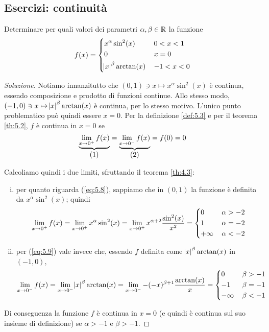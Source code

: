 \subsection{Esercizi: continuità}
\begin{exercise}
    \label{ex:5.3}
    Determinare per quali valori dei parametri $\alpha, \beta\in\amsbb{R}$ la funzione
    \[
    f(x) = \begin{dcases}
        x^\alpha\sin^2(x)\, & 0<x<1\\
        0\, & x=0\\
        \abs{x}^\beta \arctan(x)\, & -1<x<0
    \end{dcases}
    \]
\end{exercise}
\begin{proof}[Soluzione]
    Notiamo innanzitutto che $(0,1)\ni x \mapsto x^\alpha \sin^2(x)$ è continua, essendo composizione e prodotto di funzioni continue. Allo stesso modo, $(-1, 0)\ni x \mapsto \abs{x}^\beta \arctan(x)$ è continua, per lo stesso motivo. L'unico punto problematico può quindi essere $x=0$. Per la definizione \ref{def:5.3} e per il teorema \ref{th:5.2}, $f$ è continua in $x=0$ se
    \[
    \underbrace{\lim_{x\to 0^+} f(x)}_{\stepcounter{equation}\mbox{(\theequation)}} = \underbrace{\lim_{x\to 0^-} f(x)}_{\stepcounter{equation}\mbox{(\theequation)}} = f(0) = 0
    \]
    \addtocounter{equation}{-2}\label{eq:5.8}
    \addtocounter{equation}{0}\label{eq:5.9}
    Calcoliamo quindi i due limiti, sfruttando il teorema \ref{th:4.3}:
    \begin{enumerate}[(i)]
        \item per quanto riguarda (\ref{eq:5.8}), sappiamo che in $(0,1)$ la funzione è definita da $x^\alpha\sin^2(x)$; quindi
        \[
        \lim_{x\to 0^+}f(x) = \lim_{x\to 0^+} x^\alpha \sin^2(x) = \lim_{x\to 0^+} x^{\alpha +2} \frac{\sin^2(x)}{x^2} = \begin{dcases}
            0\, & \alpha>-2\\
            1\, & \alpha = -2\\
            +\infty\, & \alpha<-2
        \end{dcases}
        \]
        \item per (\ref{eq:5.9}) vale invece che, essendo $f$ definita come $\abs{x}^\beta \arctan(x)$ in $(-1,0)$,
        \[
        \lim_{x\to 0^-} f(x) = \lim_{x\to 0^-} \abs{x}^\beta \arctan(x) = \lim_{x\to 0^-} -(-x)^{\beta+1} \frac{\arctan(x)}{x}= \begin{dcases}
            0\, & \beta>-1\\
            -1\, & \beta=-1\\
            -\infty\, & \beta<-1
        \end{dcases}
        \]
    \end{enumerate}
    Di conseguenza la funzione $f$ è continua in $x=0$ (e quindi è continua sul suo insieme di definizione) se $\alpha>-1$ e $\beta>-1$.
\end{proof}
